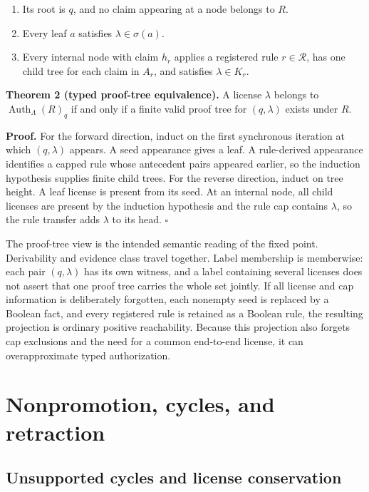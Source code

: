 \documentclass[pdflatex,sn-mathphys-num]{sn-jnl}
\providecommand{\tightlist}{%
  \setlength{\itemsep}{0pt}\setlength{\parskip}{0pt}}
\begin{document}
\begin{enumerate}
\def\labelenumi{\arabic{enumi}.}
\tightlist
\item
  Its root is \(q\), and no claim appearing at a node belongs to \(R\).
\item
  Every leaf \(a\) satisfies \(\lambda\in\sigma(a)\).
\item
  Every internal node with claim \(h_r\) applies a registered rule \(r\in\mathcal{R}\), has one child tree for each claim in \(A_r\), and satisfies \(\lambda\in K_r\).
\end{enumerate}

\textbf{Theorem 2 (typed proof-tree equivalence).} A license \(\lambda\) belongs to \(\operatorname{Auth}_\Lambda(R)_q\) if and only if a finite valid proof tree for \((q,\lambda)\) exists under \(R\).

\textbf{Proof.} For the forward direction, induct on the first synchronous iteration at which \((q,\lambda)\) appears. A seed appearance gives a leaf. A rule-derived appearance identifies a capped rule whose antecedent pairs appeared earlier, so the induction hypothesis supplies finite child trees. For the reverse direction, induct on tree height. A leaf license is present from its seed. At an internal node, all child licenses are present by the induction hypothesis and the rule cap contains \(\lambda\), so the rule transfer adds \(\lambda\) to its head. \(\square\)

The proof-tree view is the intended semantic reading of the fixed point. Derivability and evidence class travel together. Label membership is memberwise: each pair \((q,\lambda)\) has its own witness, and a label containing several licenses does not assert that one proof tree carries the whole set jointly. If all license and cap information is deliberately forgotten, each nonempty seed is replaced by a Boolean fact, and every registered rule is retained as a Boolean rule, the resulting projection is ordinary positive reachability. Because this projection also forgets cap exclusions and the need for a common end-to-end license, it can overapproximate typed authorization.

\section{Nonpromotion, cycles, and retraction}\label{nonpromotion-cycles-and-retraction}

\subsection{Unsupported cycles and license conservation}\label{unsupported-cycles-and-license-conservation}
\end{document}
